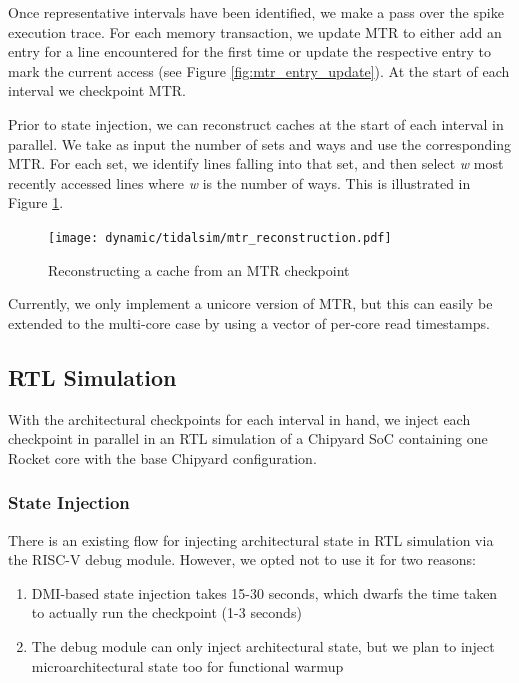 \documentclass[sigplan,nonacm,10pt]{acmart}
\begin{document}
Once representative intervals have been identified, we make a pass over the spike execution trace. For each memory transaction, we update MTR to either add an entry for a line encountered for the first time or update the respective entry to mark the current access (see Figure \ref{fig:mtr_entry_update}). At the start of each interval we checkpoint MTR.

Prior to state injection, we can reconstruct caches at the start of each interval in parallel. We take as input the number of sets and ways and use the corresponding MTR. For each set, we identify lines falling into that set, and then select \textit{w} most recently accessed lines where \textit{w} is the number of ways. This is illustrated in Figure \ref{fig:mtr_reconstruction}.

\begin{figure}
  \texttt{[image: dynamic/tidalsim/mtr\_reconstruction.pdf]}
  \caption{Reconstructing a cache from an MTR checkpoint}
  \label{fig:mtr_reconstruction}
\end{figure}

Currently, we only implement a unicore version of MTR, but this can easily be extended to the multi-core case by using a vector of per-core read timestamps.

\subsection{RTL Simulation}

With the architectural checkpoints for each interval in hand, we inject each checkpoint in parallel in an RTL simulation of a Chipyard SoC containing one Rocket core with the base Chipyard configuration.

\subsubsection{State Injection}

There is an existing flow for injecting architectural state in RTL simulation via the RISC-V debug module.
However, we opted not to use it for two reasons:
\begin{enumerate}
  \item DMI-based state injection takes 15-30 seconds, which dwarfs the time taken to actually run the checkpoint (1-3 seconds)
  \item The debug module can only inject architectural state, but we plan to inject microarchitectural state too for functional warmup
\end{enumerate}
\end{document}
